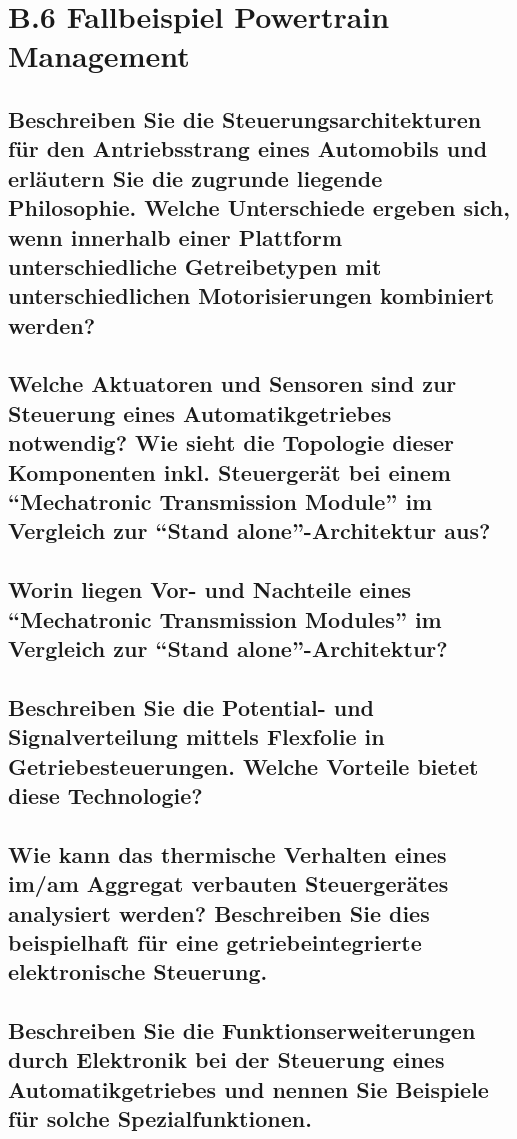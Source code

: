 \section*{B.6 Fallbeispiel Powertrain Management}

\subsection{Beschreiben Sie die Steuerungsarchitekturen f\"ur den Antriebsstrang eines Automobils und erl\"autern Sie die zugrunde liegende Philosophie. Welche Unterschiede ergeben sich, wenn innerhalb einer Plattform unterschiedliche Getreibetypen mit unterschiedlichen Motorisierungen kombiniert werden?}

\subsection{Welche Aktuatoren und Sensoren sind zur Steuerung eines Automatikgetriebes notwendig? Wie sieht die Topologie dieser Komponenten inkl. Steuerger\"at bei einem ``Mechatronic Transmission Module'' im Vergleich zur ``Stand alone''-Architektur aus?}

\subsection{Worin liegen Vor- und Nachteile eines ``Mechatronic Transmission Modules'' im Vergleich zur ``Stand alone''-Architektur?}

\subsection{Beschreiben Sie die Potential- und Signalverteilung mittels Flexfolie in Getriebesteuerungen. Welche Vorteile bietet diese Technologie?}

\subsection{Wie kann das thermische Verhalten eines im/am Aggregat verbauten Steuerger\"ates analysiert werden? Beschreiben Sie dies beispielhaft f\"ur eine getriebeintegrierte elektronische Steuerung.}

\subsection{Beschreiben Sie die Funktionserweiterungen durch Elektronik bei der Steuerung eines Automatikgetriebes und nennen Sie Beispiele f\"ur solche Spezialfunktionen.}

